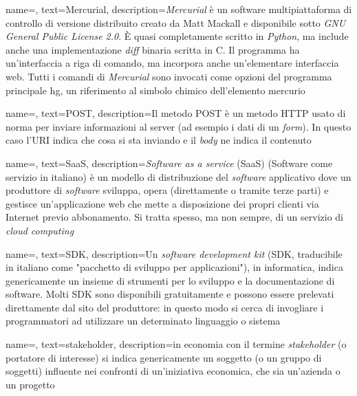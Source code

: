 {
    name=,
    text=Mercurial,
    description={\emph{Mercurial} è un software multipiattaforma di controllo di versione distribuito creato da Matt Mackall e disponibile sotto \emph{GNU General Public License 2.0}.
È quasi completamente scritto in \emph{Python}, ma include anche una implementazione \emph{diff} binaria scritta in C. Il programma ha un'interfaccia a riga di comando, ma incorpora anche un'elementare interfaccia web. 
Tutti i comandi di \emph{Mercurial} sono invocati come opzioni del programma principale hg, un riferimento al simbolo chimico dell'elemento mercurio}
}

{
    name=,
    text=POST,
    description={Il metodo POST è un metodo HTTP usato di norma per inviare informazioni
al server (ad esempio i dati di un \emph{form}). In questo caso l’URI indica che cosa si
sta inviando e il \emph{body} ne indica il contenuto}
}

{
    name=,
    text=SaaS,
    description={\emph{Software as a service} (SaaS) (Software come servizio in italiano) è un modello di distribuzione del \emph{software} applicativo dove un produttore di \emph{software} sviluppa, opera (direttamente o tramite terze parti) e gestisce un'applicazione web che mette a disposizione dei propri clienti via Internet previo abbonamento. Si tratta spesso, ma non sempre, di un servizio di \emph{cloud computing}}
}

{
    name=,
    text=SDK,
    description={Un \emph{software development kit} (SDK, traducibile in italiano come "pacchetto di sviluppo per applicazioni"), in informatica, indica genericamente un insieme di strumenti per lo sviluppo e la documentazione di software. Molti SDK sono disponibili gratuitamente e possono essere prelevati direttamente dal sito del produttore: in questo modo si cerca di invogliare i programmatori ad utilizzare un determinato linguaggio o sistema}
}

{
    name=,
    text=stakeholder,
    description={in economia con il termine \emph{stakeholder} (o portatore di interesse)
si indica genericamente un soggetto (o un gruppo di soggetti) influente nei
confronti di un’iniziativa economica, che sia un’azienda o un progetto}
}

